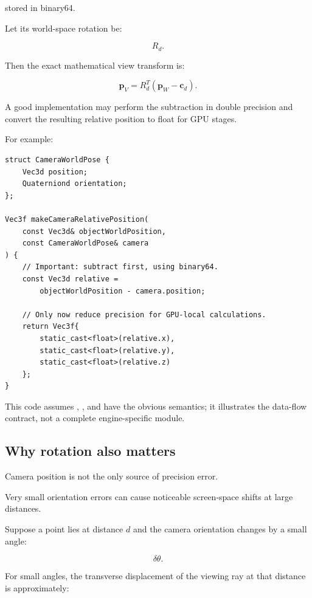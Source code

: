 stored in binary64.

Let its world-space rotation be:

\[
 R_d.
\]

Then the exact mathematical view transform is:

\[
 \boxed{ \mathbf p_V=R_d^T(\mathbf p_W-\mathbf c_d) }.
\]

A good implementation may perform the subtraction in double precision and convert the resulting relative position to float for GPU stages.

For example:

\begin{verbatim}
struct CameraWorldPose {
    Vec3d position;
    Quaterniond orientation;
};

Vec3f makeCameraRelativePosition(
    const Vec3d& objectWorldPosition,
    const CameraWorldPose& camera
) {
    // Important: subtract first, using binary64.
    const Vec3d relative =
        objectWorldPosition - camera.position;

    // Only now reduce precision for GPU-local calculations.
    return Vec3f{
        static_cast<float>(relative.x),
        static_cast<float>(relative.y),
        static_cast<float>(relative.z)
    };
}
\end{verbatim}

This code assumes , , and  have the obvious semantics; it illustrates the data-flow contract, not a complete engine-specific module.

\subsection{Why rotation also matters}\label{02-foundations-ii-ch036-why-rotation-also-matters}

\hypertarget{02-foundations-ii-ch036-why-rotation-also-matters}{}

Camera position is not the only source of precision error.

Very small orientation errors can cause noticeable screen-space shifts at large distances.

Suppose a point lies at distance \(d\) and the camera orientation changes by a small angle:

\[
 \delta\theta.
\]

For small angles, the transverse displacement of the viewing ray at that distance is approximately:

